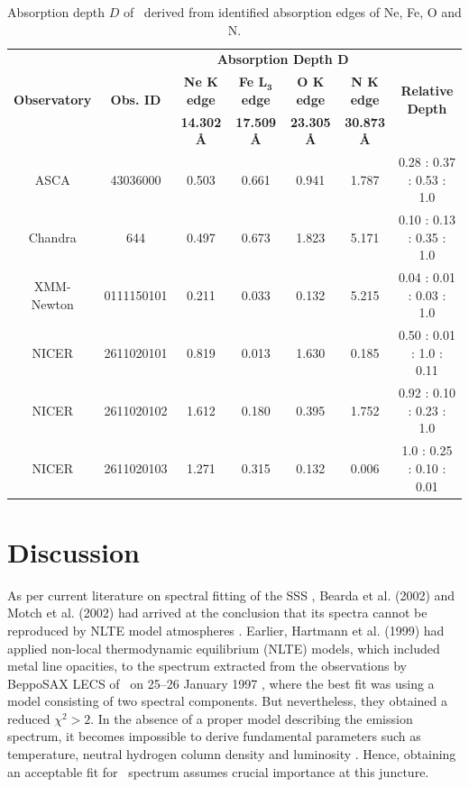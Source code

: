 			\begin{landscape}
		    \renewcommand{\arraystretch}{2.2}
		    \begin{table}[!htb]
		    	\centering
		    	\caption{Absorption depth $D$ of \source\ derived from identified absorption edges of Ne, Fe, O and N.}
		    	\label{tab:abs-depth}
				\begin{tabular}{ccccccc}
					\hline
					\multirow{3}{*}{\textbf{Observatory}} & \multirow{3}{*}{\textbf{Obs. ID}} & \multicolumn{4}{c}{\textbf{Absorption Depth $\boldsymbol{D}$}} & \multirow{3}{*}{\textbf{Relative Depth}} \\ \cline{3-6} & & \textbf{Ne $\boldsymbol{K}$ edge} & \textbf{Fe $\boldsymbol{L_3}$ edge} & \textbf{O $\boldsymbol{K}$ edge} & \textbf{N $\boldsymbol{K}$ edge} \\ \cline{3-6} & & \textbf{14.302 \AA} & \textbf{17.509 \AA} & \textbf{23.305 \AA} & \textbf{30.873 \AA} \\
					\hline
					{ASCA} & {43036000} & {0.503} & {0.661} & {0.941} & {1.787} & {0.28 : 0.37 : 0.53 : 1.0} \\ %
					{Chandra} & {644} & {0.497} & {0.673} & {1.823} & {5.171} & {0.10 : 0.13 : 0.35 : 1.0} \\ %
					{XMM-Newton} & {0111150101} & {0.211} & {0.033} & {0.132} & {5.215} & {0.04 : 0.01 : 0.03 : 1.0} \\ %
					{NICER} & {2611020101} & {0.819} & {0.013} & {1.630} & {0.185} & {0.50 : 0.01 : 1.0 : 0.11} \\ %
					{NICER} & {2611020102} & {1.612} & {0.180} & {0.395} & {1.752} & {0.92 : 0.10 : 0.23 : 1.0} \\ %
					{NICER} & {2611020103} & {1.271} & {0.315} & {0.132} & {0.006} & {1.0 : 0.25 : 0.10 : 0.01} \\ %
					\hline
				\end{tabular}
			\end{table}
			\renewcommand{\arraystretch}{1.6}
		    \end{landscape}

    	
    \section{Discussion} \label{multi-obs:discussion}
    	As per current literature on spectral fitting of the SSS \source, Bearda et al. (2002) and Motch et al. (2002) had arrived at the conclusion that its spectra cannot be reproduced by NLTE model atmospheres \cite{beardaChandra2002AA,motchXmmNewton2002AA}. Earlier, Hartmann et al. (1999) had applied non-local thermodynamic equilibrium (NLTE) models, which included metal line opacities, to the spectrum extracted from the observations by BeppoSAX LECS of \source\ on 25--26 January 1997 \cite{hartmann1999constraining}, where the best fit was using a model consisting of two spectral components. But nevertheless, they obtained a reduced $\chi^2>2$. In the absence of a proper model describing the emission spectrum, it becomes impossible to
derive fundamental parameters such as temperature, neutral hydrogen column density and luminosity \cite{motchXmmNewton2002AA}. Hence, obtaining an acceptable fit for \source\ spectrum assumes crucial importance at this juncture.
    
